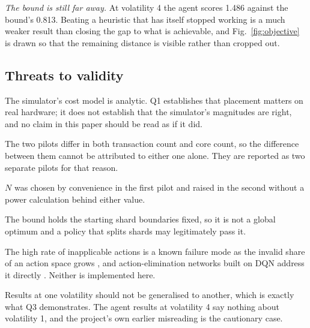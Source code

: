 \emph{The bound is still far away.} At volatility 4 the agent scores 1.486
against the bound's 0.813. Beating a heuristic that has itself stopped
working is a much weaker result than closing the gap to what is achievable,
and Fig.~\ref{fig:objective} is drawn so that the remaining distance is
visible rather than cropped out.

\subsection{Threats to validity}

The simulator's cost model is analytic. Q1 establishes that placement
matters on real hardware; it does not establish that the simulator's
magnitudes are right, and no claim in this paper should be read as if it
did.

The two pilots differ in both transaction count and core count, so the
difference between them cannot be attributed to either one alone. They are
reported as two separate pilots for that reason.

$N$ was chosen by convenience in the first pilot and raised in the second
without a power calculation behind either value.

The bound holds the starting shard boundaries fixed, so it is not a global
optimum and a policy that splits shards may legitimately pass it.

The high rate of inapplicable actions is a known failure mode as the
invalid share of an action space grows \cite{huang2022masking}, and
action-elimination networks built on DQN address it directly
\cite{zahavy2018elimination}. Neither is implemented here.

Results at one volatility should not be generalised to another, which is
exactly what Q3 demonstrates. The agent results at volatility 4 say nothing
about volatility 1, and the project's own earlier misreading is the
cautionary case.
